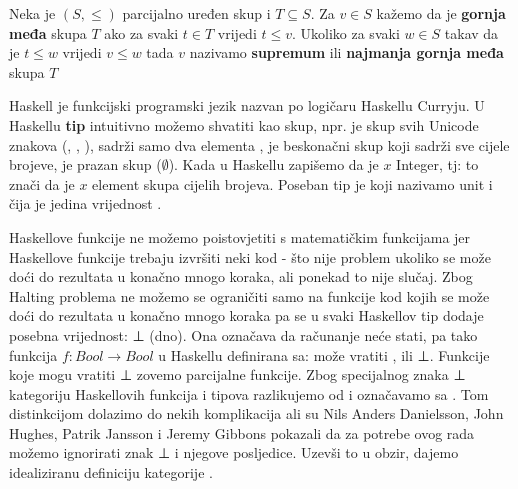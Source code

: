   \begin{definition}
    Neka je $(S, \leq)$ parcijalno uređen skup i $T \subseteq S$.
    Za $v \in S$ kažemo da je \textbf{gornja međa} skupa $T$ ako za svaki $t \in T$ vrijedi $t \leq v$. Ukoliko za svaki $w \in S$ takav da je $t \leq w$ vrijedi  $v \leq w$ tada $v$ nazivamo
    \textbf{supremum} ili \textbf{najmanja gornja međa} skupa $T$

    \end{definition}
 
  Haskell je funkcijski programski jezik nazvan po logičaru Haskellu Curryju. U
  Haskellu \textbf{tip} intuitivno možemo shvatiti kao skup, npr.
   je skup svih Unicode znakova (,
  , ),  sadrži samo dva elementa
  ,  je beskonačni skup koji sadrži
  sve cijele brojeve,  je prazan skup ($\emptyset$).
  Kada u Haskellu zapišemo da je $x$ Integer, tj:
  to znači da je $x$ element skupa cijelih brojeva. Poseban tip je
  \codei{()} koji nazivamo unit i čija je jedina vrijednost
  \codei{()}.

  Haskellove funkcije ne možemo poistovjetiti s matematičkim funkcijama jer
  Haskellove funkcije trebaju izvršiti neki kod - što nije problem ukoliko se
  može doći do rezultata u konačno mnogo koraka, ali ponekad to nije slučaj. Zbog Halting
  problema ne možemo se
  ograničiti samo na funkcije kod kojih se može doći do rezultata u konačno
  mnogo koraka pa se u svaki Haskellov tip dodaje posebna vrijednost: ⊥ (dno).
  Ona označava da računanje neće stati, pa tako funkcija $f:
  Bool \to Bool$  u Haskellu definirana sa:
  može vratiti ,  ili ⊥. Funkcije koje mogu vratiti ⊥
  zovemo parcijalne funkcije.
  Zbog specijalnog znaka ⊥ kategoriju Haskellovih funkcija i tipova razlikujemo
  od  i označavamo sa . Tom distinkcijom dolazimo
  do nekih komplikacija
  ali su Nils Anders Danielsson, John Hughes, Patrik Jansson i Jeremy Gibbons  pokazali
  da za potrebe ovog rada možemo ignorirati znak ⊥ i njegove posljedice. Uzevši to u obzir, dajemo idealiziranu definiciju kategorije .\\
  
